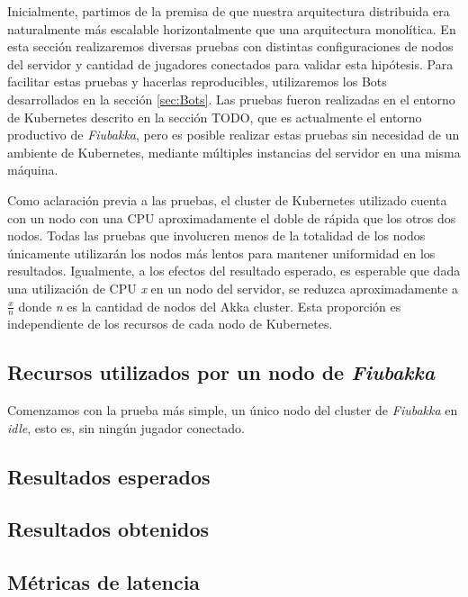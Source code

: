 
\noindent Inicialmente, partimos de la premisa de que nuestra arquitectura distribuida era naturalmente más escalable horizontalmente
que una arquitectura monolítica. En esta sección realizaremos diversas pruebas con distintas configuraciones de nodos del servidor y cantidad
de jugadores conectados para validar esta hipótesis. Para facilitar estas pruebas y hacerlas reproducibles, utilizaremos los Bots desarrollados
en la sección \ref{sec:Bots}. Las pruebas fueron realizadas en el entorno de Kubernetes descrito en la sección TODO, que es actualmente el entorno
productivo de \textit{Fiubakka}, pero es posible realizar estas pruebas sin necesidad de un ambiente de Kubernetes, mediante múltiples instancias del
servidor en una misma máquina.

Como aclaración previa a las pruebas, el cluster de Kubernetes utilizado cuenta con un nodo con una CPU aproximadamente el doble de rápida que los otros dos nodos.
Todas las pruebas que involucren menos de la totalidad de los nodos únicamente utilizarán los nodos más lentos para mantener uniformidad en los resultados.
Igualmente, a los efectos del resultado esperado, es esperable que dada una utilización de CPU \textit{x} en un nodo del servidor, se reduzca aproximadamente a
$\frac{x}{n}$ donde \textit{n} es la cantidad de nodos del Akka cluster. Esta proporción es independiente de los recursos de cada nodo de Kubernetes.

\subsection{Recursos utilizados por un nodo de \textit{Fiubakka}}

\noindent Comenzamos con la prueba más simple, un único nodo del cluster de \textit{Fiubakka} en \textit{idle}, esto es, sin ningún jugador conectado.



\subsection{Resultados esperados}

\subsection{Resultados obtenidos}

\subsection{Métricas de latencia}
